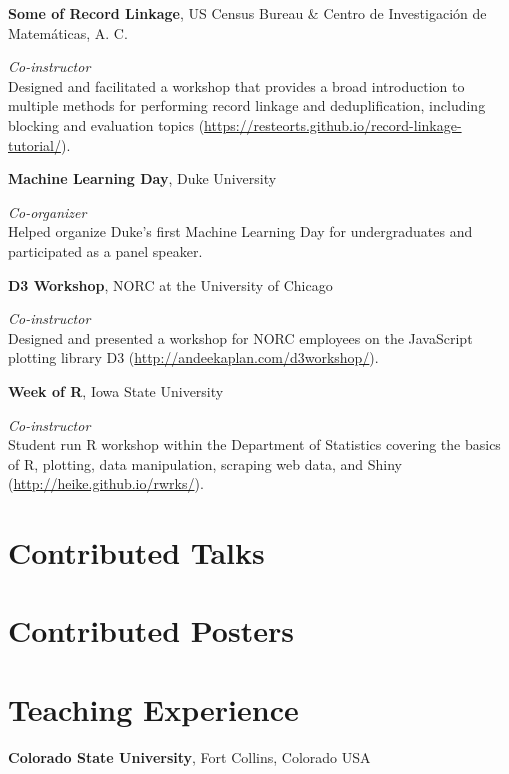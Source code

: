 \documentclass[margin,line]{res}
\begin{document}
\begin{resume}
{\bf Some of Record Linkage}, US Census Bureau \& Centro de Investigaci\'{o}n de Matem\'{a}ticas, A. C.

\vspace{-.3cm}
{\em Co-instructor} \hfill \\
Designed and facilitated a workshop that provides a broad introduction to multiple methods for performing record linkage and deduplification, including blocking and evaluation topics (\url{https://resteorts.github.io/record-linkage-tutorial/}).


{\bf Machine Learning Day}, Duke University

\vspace{-.3cm}
{\em Co-organizer} \hfill \\
Helped organize Duke's first Machine Learning Day for undergraduates and participated as a panel speaker.

{\bf D3 Workshop}, NORC at the University of Chicago

\vspace{-.3cm}
{\em Co-instructor} \hfill \\
Designed and presented a workshop for NORC employees on the JavaScript plotting library D3 (\url{http://andeekaplan.com/d3workshop/}).

{\bf Week of R}, Iowa State University

\vspace{-.3cm}
{\em Co-instructor} \hfill \\
Student run R workshop within the Department of Statistics covering the basics of R, plotting, data manipulation, scraping web data, and Shiny (\url{http://heike.github.io/rwrks/}).


\section{\sc Contributed Talks}
\printbibliography[keyword=talk-contributed, heading=none, resetnumbers=true]

\section{\sc Contributed Posters}
\printbibliography[keyword=poster, heading=none, resetnumbers=true]

\section{\sc Teaching Experience}

{\bf Colorado State University}, Fort Collins, Colorado USA


\end{resume}
\end{document}
